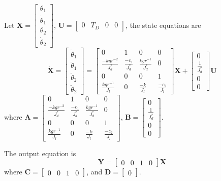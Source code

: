 \documentclass[a4paper, 12pt]{article}
\begin{document}
Let $\mathbf{X} = \begin{bmatrix}
\theta_1 	\\
\dot{\theta}_1	\\
\theta_2	\\
\dot{\theta}_2	
\end{bmatrix}
$, 
$\mathbf{U} = \begin{bmatrix}
0 & T_D	&	0	&	0
\end{bmatrix}
$, the state equations are
\begin{equation}\label{flexiblestate}
\mathbf{\dot{X}} = \begin{bmatrix}
\dot{\theta}_1	\\
\ddot{\theta}_1	\\
\dot{\theta}_2	\\
\ddot{\theta}_2	
\end{bmatrix}
 =  %
 \begin{bmatrix}
 0	&	1	&	0	&	0	\\
 \frac{-kgr^{-2}}{J_d^*}	&	\frac{-c_1}{J_d^*}	&	\frac{kgr^{-1}}{J_d^*}	&	0	\\
 0	&	0	&	0	&	1	\\
 \frac{kgr^{-1}}{J_l}	&	0	&	\frac{-k}{J_l}	&	\frac{-c_2}{J_l}
 \end{bmatrix}
 \mathbf{X} + %
 \begin{bmatrix}
 0	\\
 \frac{1}{J_d^*}	\\
 0	\\
 0
 \end{bmatrix} \mathbf{U}
\end{equation}
where $\mathbf{A} =  \begin{bmatrix}
 0	&	1	&	0	&	0	\\
 \frac{-kgr^{-2}}{J_d^*}	&	\frac{-c_1}{J_d^*}	&	\frac{kgr^{-1}}{J_d^*}	&	0	\\
 0	&	0	&	0	&	1	\\
 \frac{kgr^{-1}}{J_l}	&	0	&	\frac{-k}{J_l}	&	\frac{-c_2}{J_l}
 \end{bmatrix}$, 
 $\mathbf{B} =  \begin{bmatrix}
 0	\\
 \frac{1}{J_d^*}	\\
 0	\\
 0
 \end{bmatrix}$.

The output equation is
\begin{equation} \label{flexibleoutput}
\mathbf{Y} = \begin{bmatrix}
0	&	0	&	1	&	0	
\end{bmatrix} \mathbf{X}
\end{equation}
where $\mathbf{C} = \begin{bmatrix}
0	&	0	&	1	&	0	
\end{bmatrix} $, and $\mathbf{D} = \begin{bmatrix} 0 \end{bmatrix}$.
\end{document}
